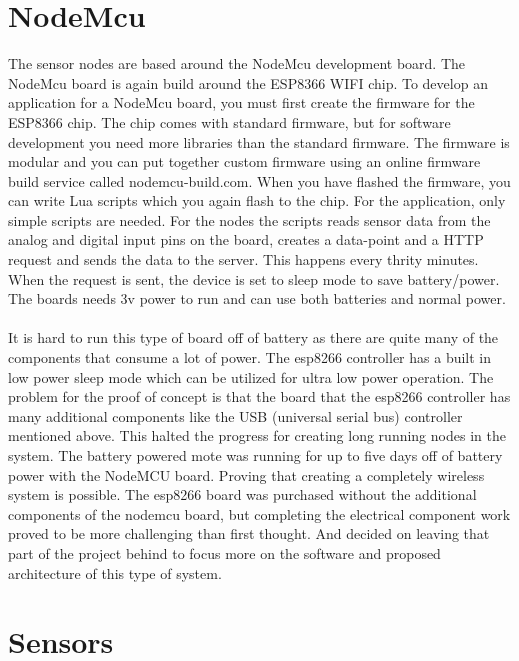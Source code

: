 \documentclass[]{uiophd}
\begin{document}
\section{NodeMcu}
The sensor nodes are based around the NodeMcu development board. The NodeMcu board is again build around the ESP8366 WIFI chip. To develop an application for a NodeMcu board, you must first create the firmware for the ESP8366 chip. The chip comes with standard firmware, but for software development you need more libraries than the standard firmware. The firmware is modular and you can put together custom firmware using an online firmware build service called nodemcu-build.com. When you have flashed the firmware, you can write Lua scripts which you again flash to the chip. For the application, only simple scripts are needed. For the nodes the scripts reads sensor data from the analog and digital input pins on the board, creates a data-point and a HTTP request and sends the data to the server. This happens every thrity minutes.  When the request is sent, the device is set to sleep mode to save battery/power. The boards needs 3v power to run and can use both batteries and normal power.
\\\\
It is hard to run this type of board off of battery as there are quite many of the components that consume a lot of power. The esp8266 controller has a built in low power sleep mode which can be utilized for ultra low power operation. The problem for the proof of concept is that the board that the esp8266 controller has many additional components like the USB (universal serial bus) controller mentioned above. This halted the progress for creating long running nodes in the system. The battery powered mote was running for up to five days off of battery power with the NodeMCU board. Proving that creating a completely wireless system is possible. The esp8266 board was purchased without the additional components of the nodemcu board, but completing the electrical component work proved to be more challenging than first thought. And decided on leaving that part of the project behind to focus more on the software and proposed architecture of this type of system.

\section{Sensors}
\end{document}
